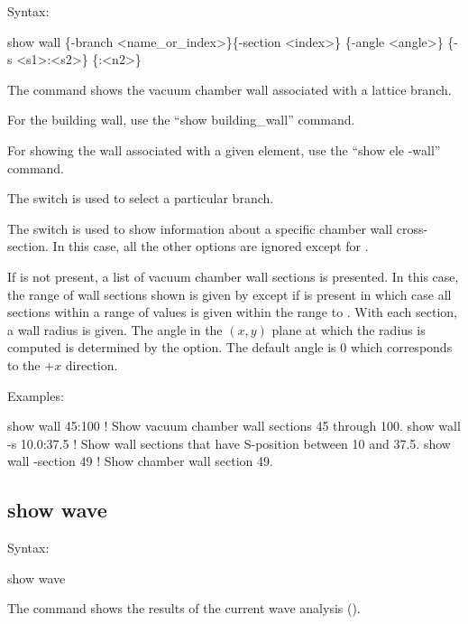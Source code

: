 {{{{{{{{{{Syntax:
\begin{example}
  show wall \{-branch <name_or_index>\}\{-section <index>\} \{-angle <angle>\}
  \{-s <s1>:<s2>\} \{<n1>:<n2>\}
\end{example}

The  command shows the vacuum chamber wall associated with a lattice branch.

For the building wall, use the ``show building_wall'' command.

For showing the wall associated with a given element, use the ``show ele -wall'' command.

The  switch is used to select a particular branch.

The  switch is used to show information about a specific chamber wall cross-section. In
this case, all the other options are ignored except for .

If  is not present, a list of vacuum chamber wall sections is presented. In this case,
the range of wall sections shown is given by  except if  is present in which
case all sections within a range of  values is given within the range  to
. With each section, a wall radius is given. The angle in the $(x,y)$ plane at which the
radius is computed is determined by the  option. The default angle is 0 which corresponds
to the $+x$ direction.

Examples:
\begin{example}
  show wall 45:100       ! Show vacuum chamber wall sections 45 through 100.
  show wall -s 10.0:37.5 ! Show wall sections that have S-position between 10 and 37.5.
  show wall -section 49  ! Show chamber wall section 49.
\end{example}


\subsection{show wave}
\label{s:show.wave}

Syntax:
\begin{example}
  show wave
\end{example}

The  command shows the results of the current wave analysis ().


}}}}}}}}}}

